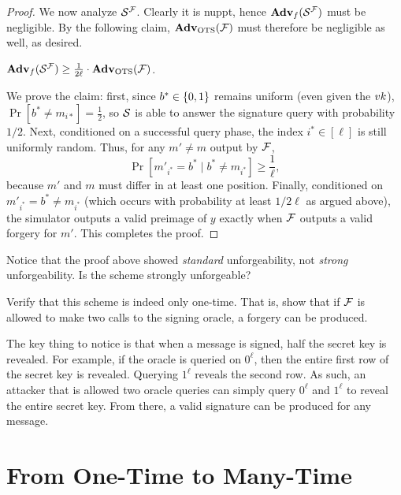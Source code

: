 \documentclass[11pt]{article}
\begin{document}
\begin{proof}
  We now analyze $\mathcal{S}^{\mathcal{F}}$.  Clearly it is nuppt, hence
  $\mathbf{Adv}_{f}(\mathcal{S}^{\mathcal{F}})$ must be negligible.  By the following
  claim, $\mathbf{Adv}_{\text{OTS}}(\mathcal{F})$ must therefore be negligible as well,
  as desired.

  \begin{claim}
    $\mathbf{Adv}_{f}(\mathcal{S}^{\mathcal{F}}) \geq \frac{1}{2\ell} \cdot
    \mathbf{Adv}_{\text{OTS}}(\mathcal{F})$.
  \end{claim}

  We prove the claim: first, since $b^* \in \{0,1\}$ remains uniform
  (even given the $vk$), $\Pr[b^* \neq m_{i*}] = \frac{1}{2}$, so
  $\mathcal{S}$ is able to answer the signature query with probability $1/2$.
  Next, conditioned on a successful query phase, the index $i^{*} \in
  [\ell]$ is still uniformly random.  Thus, for any $m' \neq m$ output
  by $\mathcal{F}$, \[ \Pr[m'_{i^*} = b^{*} \mid b^* \neq m_{i^{*}} ] \geq
  \frac{1}{\ell}, \] because $m'$ and $m$ must differ in at least one
  position.  Finally, conditioned on $m'_{i^{*}} = b^{*} \neq
  m_{i^{*}}$ (which occurs with probability at least $1/2\ell$ as
  argued above), the simulator outputs a valid preimage of $y$ exactly
  when $\mathcal{F}$ outputs a valid forgery for $m'$.  This completes the
  proof.
\end{proof}

\begin{remark}
  Notice that the proof above showed \emph{standard} unforgeability,
  not \emph{strong} unforgeability.  Is the scheme strongly
  unforgeable?
\end{remark}

\begin{question}
  Verify that this scheme is indeed only one-time. That is, show that
  if \(\mathcal{F}\) is allowed to make two calls to the signing oracle, a
  forgery can be produced.
\end{question}

\begin{answer}
  The key thing to notice is that when a message is signed, half the
  secret key is revealed. For example, if the oracle is queried on
  \(0^\ell\), then the entire first row of the secret key is
  revealed. Querying \(1^\ell\) reveals the second row. As such, an
  attacker that is allowed two oracle queries can simply query
  \(0^\ell\) and \(1^\ell\) to reveal the entire secret key. From
  there, a valid signature can be produced for any message.
\end{answer}

\section{From One-Time to Many-Time}
\label{sec:many-time-signatures}
\end{document}

